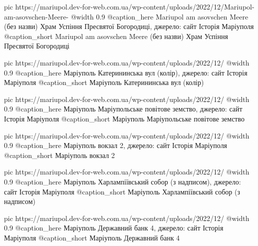   pic https://mariupol.dev-for-web.com.ua/wp-content/uploads/2022/12/Mariupol-am-asovschen-Meere-%
  @width 0.9
  @caption_here Mariupol am asovschen Meere (без назви) Храм Успіння Пресвятої Богородиці, джерело: сайт Історія Маріуполя
  @caption_short Mariupol am asovschen Meere (без назви) Храм Успіння Пресвятої Богородиці

  pic https://mariupol.dev-for-web.com.ua/wp-content/uploads/2022/12/%
  @width 0.9
  @caption_here Маріуполь Катерининська вул (колір), джерело: сайт Історія Маріуполя
  @caption_short Маріуполь Катерининська вул (колір)

  pic https://mariupol.dev-for-web.com.ua/wp-content/uploads/2022/12/%
  @width 0.9
  @caption_here Маріуполь Маріупольське повітове земство, джерело: сайт Історія Маріуполя
  @caption_short Маріуполь Маріупольське повітове земство

  pic https://mariupol.dev-for-web.com.ua/wp-content/uploads/2022/12/%
  @width 0.9
  @caption_here Маріуполь вокзал 2, джерело: сайт Історія Маріуполя
  @caption_short Маріуполь вокзал 2

  pic https://mariupol.dev-for-web.com.ua/wp-content/uploads/2022/12/%
  @width 0.9
  @caption_here Маріуполь Харлампіївський собор (з надписом), джерело: сайт Історія Маріуполя
  @caption_short Маріуполь Харлампіївський собор (з надписом)

  pic https://mariupol.dev-for-web.com.ua/wp-content/uploads/2022/12/%
  @width 0.9
  @caption_here Маріуполь Державний банк 4, джерело: сайт Історія Маріуполя
  @caption_short Маріуполь Державний банк 4

